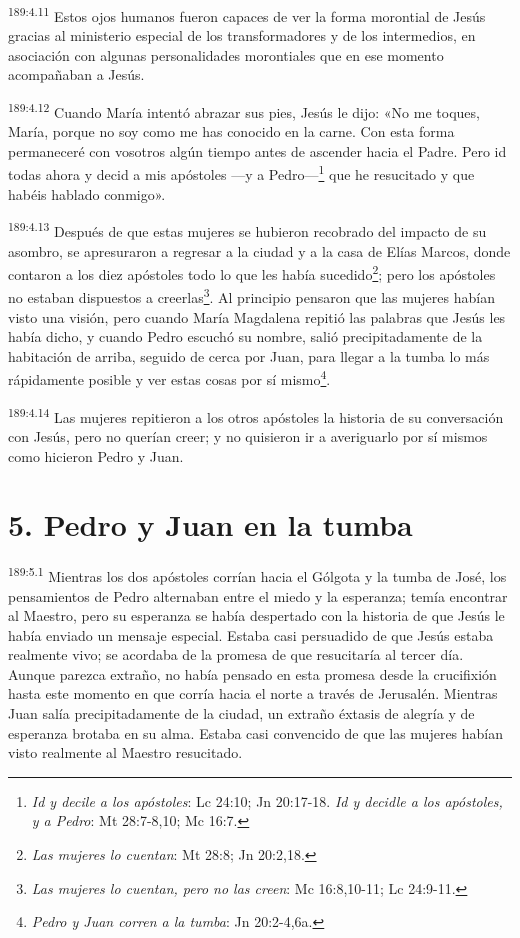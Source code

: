 \par
\textsuperscript{189:4.11} Estos ojos humanos fueron capaces de ver la forma morontial de Jesús gracias al ministerio especial de los transformadores y de los intermedios, en asociación con algunas personalidades morontiales que en ese momento acompañaban a Jesús.

\par
\textsuperscript{189:4.12} Cuando María intentó abrazar sus pies, Jesús le dijo: «No me toques, María, porque no soy como me has conocido en la carne. Con esta forma permaneceré con vosotros algún tiempo antes de ascender hacia el Padre. Pero id todas ahora y decid a mis apóstoles ---y a Pedro---\footnote{\textit{Id y decile a los apóstoles}: Lc 24:10; Jn 20:17-18. \textit{Id y decidle a los apóstoles, y a Pedro}: Mt 28:7-8,10; Mc 16:7.} que he resucitado y que habéis hablado conmigo».

\par
\textsuperscript{189:4.13} Después de que estas mujeres se hubieron recobrado del impacto de su asombro, se apresuraron a regresar a la ciudad y a la casa de Elías Marcos, donde contaron a los diez apóstoles todo lo que les había sucedido\footnote{\textit{Las mujeres lo cuentan}: Mt 28:8; Jn 20:2,18.}; pero los apóstoles no estaban dispuestos a creerlas\footnote{\textit{Las mujeres lo cuentan, pero no las creen}: Mc 16:8,10-11; Lc 24:9-11.}. Al principio pensaron que las mujeres habían visto una visión, pero cuando María Magdalena repitió las palabras que Jesús les había dicho, y cuando Pedro escuchó su nombre, salió precipitadamente de la habitación de arriba, seguido de cerca por Juan, para llegar a la tumba lo más rápidamente posible y ver estas cosas por sí mismo\footnote{\textit{Pedro y Juan corren a la tumba}: Jn 20:2-4,6a.}.

\par
\textsuperscript{189:4.14} Las mujeres repitieron a los otros apóstoles la historia de su conversación con Jesús, pero no querían creer; y no quisieron ir a averiguarlo por sí mismos como hicieron Pedro y Juan.

\section*{5. Pedro y Juan en la tumba}
\par
\textsuperscript{189:5.1} Mientras los dos apóstoles corrían hacia el Gólgota y la tumba de José, los pensamientos de Pedro alternaban entre el miedo y la esperanza; temía encontrar al Maestro, pero su esperanza se había despertado con la historia de que Jesús le había enviado un mensaje especial. Estaba casi persuadido de que Jesús estaba realmente vivo; se acordaba de la promesa de que resucitaría al tercer día. Aunque parezca extraño, no había pensado en esta promesa desde la crucifixión hasta este momento en que corría hacia el norte a través de Jerusalén. Mientras Juan salía precipitadamente de la ciudad, un extraño éxtasis de alegría y de esperanza brotaba en su alma. Estaba casi convencido de que las mujeres habían visto realmente al Maestro resucitado.

